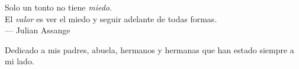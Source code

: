 
\thispagestyle{empty}


\vspace*{3cm}

\begin{center}
Solo un tonto no tiene \emph{miedo}. \\
El \emph{valor} es ver el miedo y seguir adelante de todas formas. \\ \medskip
--- Julian Assange   
\end{center}

\medskip

\begin{center}
Dedicado a mis padres, abuela, hermanos y hermanas que han estado siempre a mi lado. \\ \smallskip
\end{center}